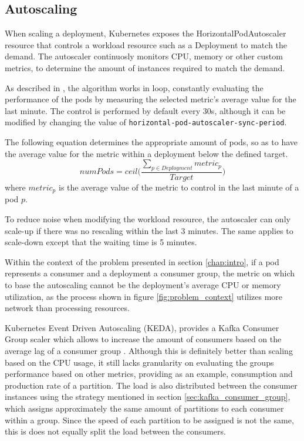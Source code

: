 \subsection{Autoscaling}

When scaling a deployment, Kubernetes exposes the HorizontalPodAutoscaler
resource that controls a workload resource such as a Deployment to match the
demand. The autoscaler continuosly monitors CPU, memory or other custom metrics,
to determine the amount of instances required to match the demand.

\begin{sloppypar}
As described in \cite{KubernetesAutoscaling}, the algorithm works in loop,
constantly evaluating the performance of the pods by measuring the selected
metric's average value for the last minute. The control is performed by default
every 30s, although it can be modified by changing the value of
\lstinline{horizontal-pod-autoscaler-sync-period}.
\end{sloppypar}

The following equation determines the appropriate amount of pods, so as to have
the average value for the metric within a deployment below the defined target.
\begin{equation}
    numPods = ceil\bigg(\frac
        {\sum_{p \in Deployment} metric_p}
        {Target}
    \bigg)
\end{equation}
where $metric_p$ is the average value of the metric to control in the last
minute of a pod $p$. 

To reduce noise when modifying the workload resource, the autoscaler can only
scale-up if there was no rescaling within the last 3 minutes. The same applies
to scale-down except that the waiting time is 5 minutes.

Within the context of the problem presented in section \ref{chap:intro}, if a
pod represents a consumer and a deployment a consumer group, the metric on
which to base the autoscaling cannot be the deployment's average CPU or memory
utilization, as the process shown in figure \ref{fig:problem_context} utilizes
more network than processing resources. 

Kubernetes Event Driven Autoscaling (KEDA), provides a Kafka Consumer Group
scaler which allows to increase the amount of consumers based on the average lag
of a consumer group \cite{KEDA}. Although this is definitely better than scaling based on
the CPU usage, it still lacks granularity on evaluating the groups performance
based on other metrics, providing as an example, consumption and production rate
of a partition. The load is also distributed between the consumer instances
using the strategy mentioned in section \ref{sec:kafka_consumer_group}, which
assigns approximately the same amount of partitions to each consumer within a
group. Since the speed of each partition to be assigned is not the same, this is
does not equally split the load between the consumers.

